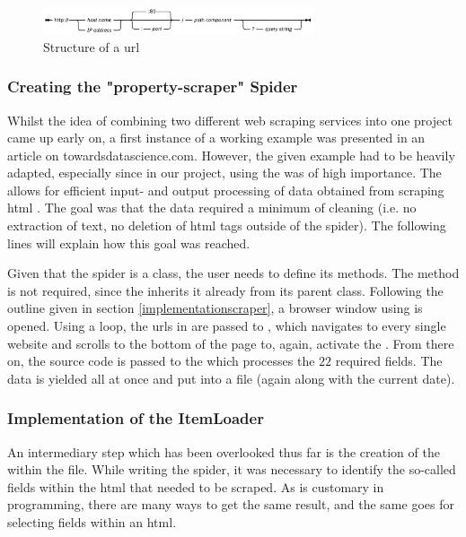\documentclass[main]{subfiles}
\begin{document}
\begin{figure}[htbp]
    \centerline{
        \includegraphics[width = 80mm]{prog_4.png}}
    \caption{Structure of a \acs*{url} \cite{IBMDocumentation2021}}
    \label{fig:htmlstructure}
\end{figure}

\vspace*{5pt}
\subsubsection{Creating the "property-scraper" Spider}
Whilst the idea of combining two different web scraping services into one project came up early on,
a first instance of a working example was presented in an article on towardsdatascience.com\cite{reusovaWebScrapingLess2019}.
However, the given example had to be heavily adapted, especially since in our project, 
using the \pkg[ItemLoader] was of high importance.
The \pkg[ItemLoader] allows for efficient input- and output processing of data obtained from scraping \acs*{html} \cite{ScrapyTutorialScrapy}. 
The goal was that the data required a minimum of cleaning (i.e. no extraction of text, no deletion of \acs*{html} tags outside of the spider).
The following lines will explain how this goal was reached.

Given that the spider is a class, the user needs to define its methods. 
The  method is not required, since the  inherits it already 
from its parent class.
Following the outline given in section \ref{implementationscraper},
a browser window using  \pkg[Selenium] is opened.
Using a \pkg[for] loop, the \acsp*{url} in  are passed to \pkg[Selenium],
which navigates to every single website and scrolls to the bottom of the page to, again, activate the \jss.
From there on, the source code is passed to the \pkg[ItemLoader] which processes the $22$ required fields.
The data is yielded all at once and put into a \pkg[.csv] file (again along with the current date).

\vspace*{5pt}
\subsubsection{Implementation of the ItemLoader}
\label{itemloader}
An intermediary step which has been overlooked thus far is the creation of the \pkg[ItemLoader] within the \pkg[items.py] file.
While writing the  spider, it was necessary to identify the so-called fields within the \acs*{html}
that needed to be scraped.
As is customary in programming, there are many ways to get the same result, 
and the same goes for selecting fields within an \acs*{html}.
\end{document}
